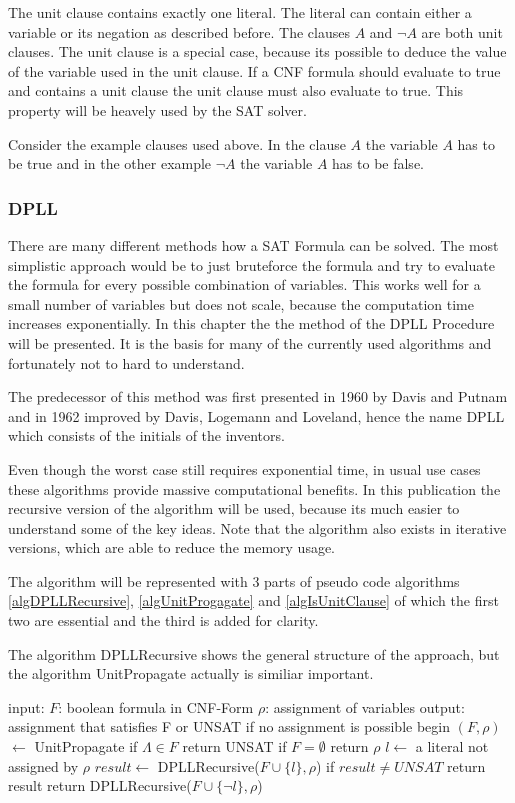 The unit clause contains exactly one literal. The literal can contain either a variable or its negation as described before. 
The clauses $A$ and $\lnot A$ are both unit clauses. 
The unit clause is a special case, because its possible to deduce the value of the variable used in the unit clause.
If a CNF formula should evaluate to true and contains a unit clause the unit clause must also evaluate to true. 
This property will be heavely used by the SAT solver.

Consider the example clauses used above. In the clause $A$ the variable $A$ has to be true and in the other example $\lnot A$ the variable $A$ has to be false.
\subsubsection{DPLL}

There are many different methods how a SAT Formula can be solved. The most simplistic approach would be to just bruteforce the formula and try to evaluate the formula for every possible combination of variables. This works well for a small number of variables but does not scale, because the computation time increases exponentially. In this chapter the the method of the DPLL Procedure will be presented. It is the basis for many of the currently used algorithms and fortunately not to hard to understand.

The predecessor of this method was first presented in 1960 by Davis and Putnam and in 1962 improved by Davis, Logemann and Loveland, hence the name DPLL which consists of the initials of the inventors.

Even though the worst case still requires exponential time, in usual use cases these algorithms provide massive computational benefits. In this publication the recursive version of the algorithm will be used, because its much easier to understand some of the key ideas. Note that the algorithm also exists in iterative versions, which are able to reduce the memory usage.

The algorithm will be represented with 3 parts of pseudo code algorithms \ref{algDPLLRecursive}, \ref{algUnitProgagate} and \ref{algIsUnitClause} of which the first two are essential and the third is added for clarity.

The algorithm DPLLRecursive shows the general structure of the approach, but the algorithm UnitPropagate actually is similiar important.

\begin{algorithm}[caption={DPLLRecursive}, label={algDPLLRecursive}]
 input: $F$: boolean formula in CNF-Form
	$\rho$: assignment of variables
 output: assignment that satisfies F or 
	UNSAT if no assignment is possible
 begin
   $(F, \rho)$  $\gets$ UnitPropagate
   if $\Lambda \in F$
	return UNSAT
   if $F = \emptyset$
	return $\rho$
   $l \gets$ a literal not assigned by $\rho$
   $result \gets$ DPLLRecursive($F \cup \{l\}, \rho$)
   if $result \neq UNSAT$
	return result
   return DPLLRecursive($F \cup \{\lnot l\}, \rho$)
\end{algorithm}

